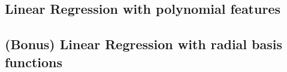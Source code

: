 \documentclass{article}
\begin{document}
\newpage

\subsection{Linear Regression with polynomial features}


\subsection{(Bonus) Linear Regression with radial basis functions}

%
%
%
\end{document}
